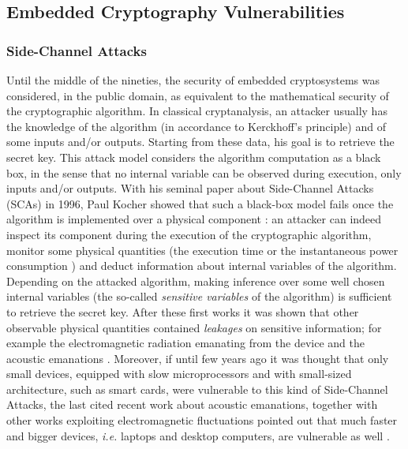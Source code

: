 \subsection{Embedded Cryptography Vulnerabilities}\label{sec:vulnerabilities}
\subsubsection{Side-Channel Attacks}\label{sec:SCAintro}
Until the middle of the nineties, the security of embedded cryptosystems was considered, in the public domain, as equivalent to the mathematical security of the cryptographic algorithm. In classical cryptanalysis, an attacker usually has the knowledge of the algorithm (in accordance to Kerckhoff's principle) and of some inputs and/or outputs. Starting from these data, his goal is to retrieve the secret key. This attack model considers the algorithm computation as a black box, in the sense that no internal variable can be observed during execution, only inputs and/or outputs. With his seminal paper about Side-Channel Attacks (SCAs) in 1996, Paul Kocher showed that such a black-box model fails once the algorithm is implemented over a physical component \cite{kocher1996timing}: an attacker can indeed inspect its component during the execution of the cryptographic algorithm, monitor some physical quantities (\eg the execution time \cite{kocher1996timing} or the instantaneous power consumption \cite{kocher1999differential}) and deduct information about internal variables of the algorithm. Depending on the attacked algorithm, making inference over some well chosen internal variables (the so-called \emph{sensitive variables} of the algorithm) is sufficient to retrieve the secret key. After these first works it was shown that other observable physical quantities contained \emph{leakages} on sensitive information; for example the electromagnetic radiation emanating from the device \cite{gandolfi2001electromagnetic,quisquater2001electromagnetic} and the acoustic emanations \cite{genkin2014rsa}. Moreover, if until few years ago it was thought that only small devices, equipped with slow microprocessors and with small-sized architecture, such as smart cards, were vulnerable to this kind of Side-Channel Attacks, the last cited recent work about acoustic emanations, together with other works exploiting electromagnetic fluctuations pointed out that much faster and bigger devices, \emph{i.e.} laptops and desktop computers, are vulnerable as well \cite{genkin2015stealing,genkin2015get,genkin2016ecdh}.

